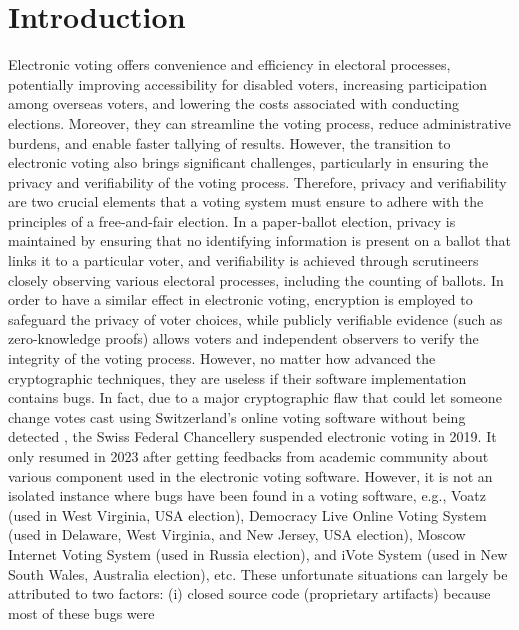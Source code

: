 \documentclass[conference,compsoc]{IEEEtran}
\begin{document}
\section{Introduction}
Electronic voting offers convenience and efficiency in electoral processes, potentially improving 
accessibility for disabled voters, increasing participation among overseas voters, and lowering 
the costs associated with conducting elections. Moreover,
they can streamline the voting process, reduce administrative burdens, and enable 
faster tallying of results. However, the transition to electronic voting also brings significant 
challenges, particularly in ensuring the privacy and verifiability of the voting process. Therefore, 
privacy and verifiability are two crucial elements that a voting system must ensure to adhere with 
the principles of a free-and-fair election. In a paper-ballot election, privacy is maintained by 
ensuring that no identifying information is present on a ballot that links it to a particular voter, 
and verifiability is achieved through scrutineers closely observing various electoral processes, 
including the counting of ballots. In order to have a similar effect in electronic voting, encryption 
is employed to safeguard the privacy of voter choices, while publicly verifiable evidence 
(such as zero-knowledge proofs) allows voters and independent observers to verify the integrity of 
the voting process. However, no matter how advanced the cryptographic techniques, they are useless 
if their software implementation contains bugs.
In fact, due to a major cryptographic flaw that
could let someone change votes cast using Switzerland's online 
voting software without being detected  \cite{9152765}, the Swiss Federal Chancellery suspended electronic voting in 
2019. It only resumed in 2023 after getting feedbacks from academic 
community \cite{swiss_evoting_chronik} about various component used in 
the electronic voting software. However, it is not an isolated  
instance where bugs have been found in a voting software, e.g., 
Voatz \cite{255334} (used in West Virginia, USA election),
Democracy Live Online Voting System \cite{263858} 
(used in Delaware, West Virginia, and New Jersey, USA election), 
Moscow Internet Voting System \cite{10.1007/978-3-030-51280-4_3}
(used in Russia election), and iVote System \cite{10.1007/978-3-319-22270-7_3, 10.1145/3014812.3014837} 
(used in New South Wales, Australia election), etc. 
These unfortunate situations can largely be attributed to two factors: 
(i) closed source code (proprietary artifacts) because most of these bugs were 
\end{document}

